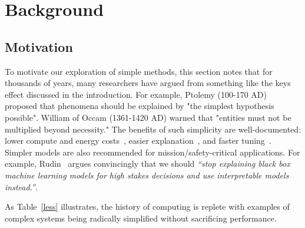 \documentclass[AMA,STIX2COL]{WileyNJDv5}
\begin{document}
\section{Background}
\subsection{Motivation}
 To  motivate our exploration of simple methods, this section notes that for thousands of years, many researchers
 have argued from something like the   keys effect
discussed in the introduction.
For example,
Ptolemy (100-170 AD) proposed that  phenomena should be explained by "the simplest hypothesis possible". 
 William of Occam (1361-1420 AD) warned that "entities must not be multiplied beyond necessity." The benefits of such simplicity are well-documented: lower compute and energy costs~\cite{calrero15,monserrate2022cloud}, easier explanation~\cite{veerappa2011understanding}, and faster tuning~\cite{fu2016tuning}. 
 Simpler models are also recommended for mission/safety-critical applications. For example, Rudin~\cite{rudin2019stop} argues convincingly that we should
{\em ``stop explaining black box machine learning models for high stakes decisions and use interpretable models instead.''}.

As Table~\ref{less} illustrates, the history of computing is replete with
examples of complex systems being radically simplified without sacrificing
performance.
\end{document}
